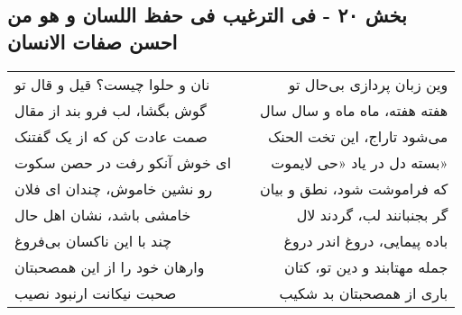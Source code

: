 \begin{center}
\section*{بخش ۲۰ - فی الترغیب فی حفظ اللسان و هو من احسن صفات الانسان}
\label{sec:020}
\begin{longtable}{l p{0.5cm} r}
نان و حلوا چیست؟ قیل و قال تو
&&
وین زبان پردازی بی‌حال تو
\\
گوش بگشا، لب فرو بند از مقال
&&
هفته هفته، ماه ماه و سال سال
\\
صمت عادت کن که از یک گفتنک
&&
می‌شود تاراج، این تخت الحنک
\\
ای خوش آنکو رفت در حصن سکوت
&&
بسته دل در یاد «حی لایموت»
\\
رو نشین خاموش، چندان ای فلان
&&
که فراموشت شود، نطق و بیان
\\
خامشی باشد، نشان اهل حال
&&
گر بجنبانند لب، گردند لال
\\
چند با این ناکسان بی‌فروغ
&&
باده پیمایی، دروغ اندر دروغ
\\
وارهان خود را از این همصحبتان
&&
جمله مهتابند و دین تو، کتان
\\
صحبت نیکانت ارنبود نصیب
&&
باری از همصحبتان بد شکیب
\\
\end{longtable}
\end{center}
